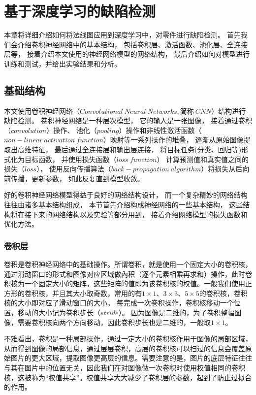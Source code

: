 \chapter{基于深度学习的缺陷检测}


本章将详细介绍如何将法线图应用到深度学习中，对零件进行缺陷检测。
首先我们会介绍卷积神经网络中的基本结构，
包括卷积层、激活函数、池化层、全连接层等，
接着介绍本文使用的神经网络模型的网络结构，
最后介绍如何对模型进行训练和测试，并给出实验结果和分析。

\section{基础结构}

本文使用卷积神经网络（$Convolutional~Neural~Networks,\mbox{简称}~CNN$）结构进行缺陷检测。
卷积神经网络是一种层次模型，
它的输入是一张图像，
接着通过卷积（$convolution$）操作、
池化\cite{chechik1998synaptic}（$pooling$）操作和非线性激活函数（$non-linear~activation~function$）映射等一系列操作的堆叠，
逐渐从原始图像提取出高维特征，
最后通过全连接层和输出层连接，
将目标任务(分类、回归等)形式化为目标函数，
并使用损失函数（$loss~function$）
计算预测值和真实值之间的损失（$loss$），
使用反向传播算法\cite{周志华2016机器学习}（$back-propagation~algorithm$）将损失从后向前传播，更新参数，
如此反复直到模型收敛。

好的卷积神经网络模型得益于良好的网络结构设计，
而一个复杂精妙的网络结构往往由诸多基本结构组成，
本节首先介绍构成神经网络的一些基本结构，
这些结构将在接下来的网络结构以及实验等部分用到，
接着介绍网络模型的损失函数和优化方法。

\subsection{卷积层}

卷积是卷积神经网络中的基础操作。所谓卷积，就是使用一个固定大小的卷积核，通过滑动窗口的形式和图像对应区域做內积（逐个元素相乘再求和）操作，此时卷积核为一个固定大小的矩阵，这些矩阵的值即为该卷积核的权值。一般我们使用正方形的卷积核，并且其大小取奇数，常用的有$1\times 1$、$3\times 3$、$5\times 5$的卷积核，卷积核的大小即对应了滑动窗口的大小。
每完成一次卷积操作，卷积核移动一个位置，移动的大小记为卷积步长（$stride$）。
因为图像是二维的，为了卷积整幅图像，需要卷积核向两个方向移动，因此卷积步长也是二维的，一般取$1\times 1$。

不难看出，卷积是一种局部操作，通过一定大小的卷积核作用于图像的局部区域，从而得到图像的局部信息，通过层层卷积，高层的卷积核可以扫过的信息会覆盖原始图片的更大区域，提取图像更高层的信息。需要注意的是，图片的底层特征往往与其在图片中的位置无关，因此我们在对图像做一次卷积时使用权值相同的卷积核，这被称为“权值共享”。权值共享大大减少了卷积层的参数，起到了防止过拟合的作用。

